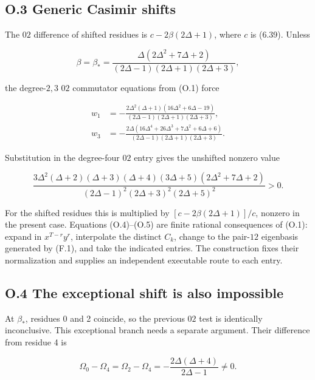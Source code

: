 \hypertarget{o.3-generic-casimir-shifts}{%
\subsection{O.3 Generic Casimir shifts}\label{o.3-generic-casimir-shifts}}

The \(02\) difference of shifted residues is \(c-2\beta(2\Delta+1)\), where \(c\) is (6.39). Unless

\[
\beta=\beta_*=
\frac{\Delta(2\Delta^2+7\Delta+2)}{(2\Delta-1)(2\Delta+1)(2\Delta+3)},
\tag{O.3}
\]

the degree-\(2,3\) \(02\) commutator equations from (O.1) force

\[
\begin{aligned}
w_1&=-\frac{2\Delta^2(\Delta+1)(16\Delta^2+6\Delta-19)}
{(2\Delta-1)(2\Delta+1)(2\Delta+3)},\\
w_3&=-\frac{2\Delta(16\Delta^4+26\Delta^3+7\Delta^2+6\Delta+6)}
{(2\Delta-1)(2\Delta+1)(2\Delta+3)}.
\end{aligned}
\tag{O.4}
\]

Substitution in the degree-four \(02\) entry gives the unshifted nonzero value

\[
\frac{3\Delta^2(\Delta+2)(\Delta+3)(\Delta+4)(3\Delta+5)(2\Delta^2+7\Delta+2)}
{(2\Delta-1)^2(2\Delta+3)^2(2\Delta+5)^2}>0.
\tag{O.5}
\]

For the shifted residues this is multiplied by \([c-2\beta(2\Delta+1)]/c\), nonzero in the present case. Equations (O.4)--(O.5) are finite rational consequences of (O.1): expand in \(x^{T-r}y^r\), interpolate the distinct \(C_k\), change to the pair-\(12\) eigenbasis generated by (F.1), and take the indicated entries. The construction fixes their normalization and supplies an independent executable route to each entry.

\hypertarget{o.4-the-exceptional-shift-is-also-impossible}{%
\subsection{O.4 The exceptional shift is also impossible}\label{o.4-the-exceptional-shift-is-also-impossible}}

At \(\beta_*\), residues 0 and 2 coincide, so the previous \(02\) test is identically inconclusive. This exceptional branch needs a separate argument. Their difference from residue 4 is

\[
\Omega_0-\Omega_4=\Omega_2-\Omega_4
=-\frac{2\Delta(\Delta+4)}{2\Delta-1}\ne0.
\tag{O.6}
\]

